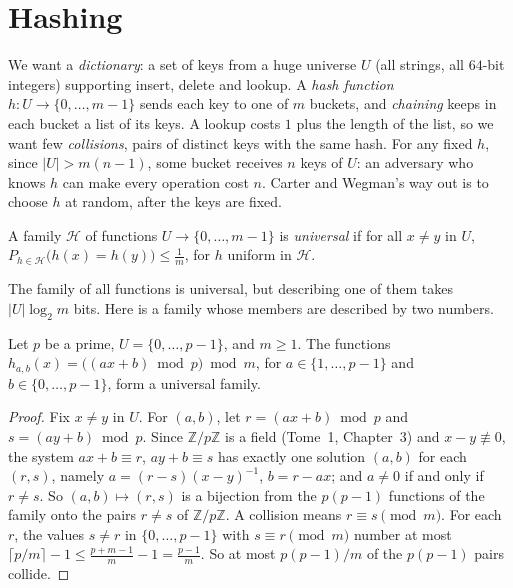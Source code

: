 \section{Hashing}\label{sec:hashing}

We want a \emph{dictionary}: a set of keys from a huge universe $U$ (all strings, all $64$-bit integers) supporting insert, delete and lookup. A \emph{hash function}
$h:U\to\{0,\dots,m-1\}$ sends each key to one of $m$ buckets, and \emph{chaining} keeps in each bucket a list of its keys. A lookup costs $1$ plus the length of the list,
so we want few \emph{collisions}, pairs of distinct keys with the same hash. For any fixed $h$, since $|U|>m(n-1)$, some bucket receives $n$ keys of $U$: an adversary who knows
$h$ can make every operation cost $n$. Carter and Wegman's way out is to choose $h$ at random, after the keys are fixed.

\begin{definition}\label{def:universal}
A family $\mathcal H$ of functions $U\to\{0,\dots,m-1\}$ is \emph{universal} if for all $x\ne y$ in $U$, $P_{h\in\mathcal H}\bigl(h(x)=h(y)\bigr)\le\frac1m$, for $h$ uniform in $\mathcal H$.
\end{definition}

The family of all functions is universal, but describing one of them takes $|U|\log_2m$ bits. Here is a family whose members are described by two numbers.

\begin{theorem}\label{thm:carterwegman}
Let $p$ be a prime, $U=\{0,\dots,p-1\}$, and $m\ge1$. The functions $h_{a,b}(x)=\bigl((ax+b)\bmod p\bigr)\bmod m$, for $a\in\{1,\dots,p-1\}$ and $b\in\{0,\dots,p-1\}$, form a universal family.
\end{theorem}
\begin{proof}
Fix $x\ne y$ in $U$. For $(a,b)$, let $r=(ax+b)\bmod p$ and $s=(ay+b)\bmod p$. Since $\mathbb Z/p\mathbb Z$ is a field (Tome~1, Chapter~3) and $x-y\not\equiv0$, the system
$ax+b\equiv r$, $ay+b\equiv s$ has exactly one solution $(a,b)$ for each $(r,s)$, namely $a=(r-s)(x-y)^{-1}$, $b=r-ax$; and $a\ne0$ if and only if $r\ne s$. So $(a,b)\mapsto(r,s)$ is a
bijection from the $p(p-1)$ functions of the family onto the pairs $r\ne s$ of $\mathbb Z/p\mathbb Z$. A collision means $r\equiv s\pmod m$. For each $r$, the values $s\ne r$ in
$\{0,\dots,p-1\}$ with $s\equiv r\pmod m$ number at most $\lceil p/m\rceil-1\le\frac{p+m-1}m-1=\frac{p-1}m$. So at most $p(p-1)/m$ of the $p(p-1)$ pairs collide.
\end{proof}

